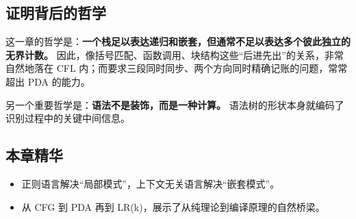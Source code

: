 \subsection{证明背后的哲学}

这一章的哲学是：\textbf{一个栈足以表达递归和嵌套，但通常不足以表达多个彼此独立的无界计数。}
因此，像括号匹配、函数调用、块结构这些“后进先出”的关系，非常自然地落在 CFL 内；而要求三段同时同步、两个方向同时精确记账的问题，常常超出 PDA 的能力。

另一个重要哲学是：\textbf{语法不是装饰，而是一种计算。} 语法树的形状本身就编码了识别过程中的关键中间信息。

\subsection{本章精华}

\begin{itemize}[leftmargin=2em]
  \item 正则语言解决“局部模式”，上下文无关语言解决“嵌套模式”。
  \item 从 CFG 到 PDA 再到 LR(k)，展示了从纯理论到编译原理的自然桥梁。
\end{itemize}

\newpage

